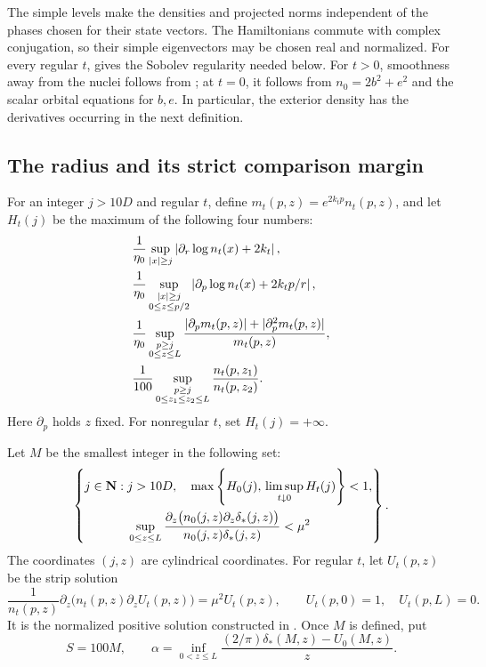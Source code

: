 The simple levels make the densities and projected norms
independent of the phases chosen for their state vectors.
The Hamiltonians commute with complex conjugation, so their simple
eigenvectors may be chosen real and normalized.
For every regular \(t\),  gives the
Sobolev regularity needed below.  For \(t>0\), smoothness away from
the nuclei follows from ; at
\(t=0\), it follows from \(n_0=2b^2+e^2\) and the scalar orbital
equations for \(b,e\).
In particular, the exterior density has the derivatives occurring
in the next definition.

\subsection{The radius and its strict comparison margin}

For an integer \(j>10D\) and regular \(t\), define
\(m_t(p,z)=e^{2k_t p}n_t(p,z)\), and let \(H_t(j)\) be the maximum of
the following four numbers:
\begin{align}
 &\frac1{\eta_0}
   \sup_{|x|\ge j}
    \left|\partial_r\log n_t(x)+2k_t\right|,
 \notag\\
 &\frac1{\eta_0}
   \sup_{\substack{|x|\ge j\\0\le z\le p/2}}
    \left|\partial_p\log n_t(x)+2k_t p/r\right|,
 \notag\\
 &\frac1{\eta_0}
   \sup_{\substack{p\ge j\\0\le z\le L}}
    \frac{|\partial_pm_t(p,z)|+|\partial_p^2m_t(p,z)|}
         {m_t(p,z)},
 \notag\\
 &\frac1{100}
   \sup_{\substack{p\ge j\\0\le z_1\le z_2\le L}}
    \frac{n_t(p,z_1)}{n_t(p,z_2)}.
 \label{eq:parameter-H}
\end{align}
Here \(\partial_p\) holds \(z\) fixed.
For nonregular \(t\), set \(H_t(j)=+\infty\).

Let \(M\) be the smallest integer in the following set:
\begin{equation}
 \left\{
 \begin{aligned}
 j\in\mathbf N:\;&j>10D,\quad
 \max\left\{H_0(j),\,\limsup_{t\downarrow0}H_t(j)\right\}<1,\\
 &\sup_{0\le z\le L}
 \frac{\partial_z\bigl(n_0(j,z)\partial_z\delta_*(j,z)\bigr)}
      {n_0(j,z)\delta_*(j,z)}
 <\mu^2
 \end{aligned}
 \right\}.
 \label{eq:parameter-radius}
\end{equation}
The coordinates \((j,z)\) are cylindrical coordinates.  For regular
\(t\), let \(U_t(p,z)\) be the strip solution
\begin{equation}
 \frac1{n_t(p,z)}
 \partial_z\bigl(n_t(p,z)\partial_zU_t(p,z)\bigr)
 =\mu^2U_t(p,z),\qquad
 U_t(p,0)=1,\quad U_t(p,L)=0 .
 \label{eq:parameter-strip-solution}
\end{equation}
It is the normalized positive solution constructed in
.  Once \(M\) is defined, put
\begin{equation}
 S=100M,\qquad
 \alpha=\inf_{0<z\le L}
 \frac{(2/\pi)\delta_*(M,z)-U_0(M,z)}{z}.
 \label{eq:parameter-alpha}
\end{equation}

